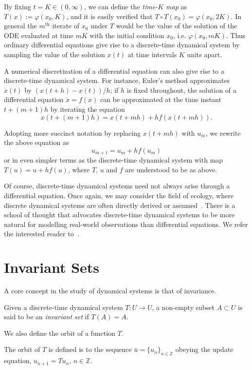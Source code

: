 By fixing $t=K \in (0,\infty)$, we can define the \emph{time-$K$ map} as  $T(x):= \varphi(x_0,K)$, and it is easily verified that $T\circ T(x_0) = \varphi(x_0,2K)$. In general the $m^{\mbox{th}}$ iterate of $x_0$ under $T$ would be the value of the solution of the ODE evaluated at time $mK$ with the initial condition $x_0$, i.e. $\varphi(x_0, mK)$. 
Thus ordinary differential equations give rise to a discrete-time dynamical system by sampling the value of the solution $x(t)$ at time intervals $K$ units apart. 


A numerical discretization of a differential equation can also give rise to a discrete-time dynamical system. For instance, Euler's method approximates $\dot{x}(t)$ by $(x(t+h)-x(t))/h$; if $h$ is fixed throughout, the solution of a differential equation $\dot{x}=f(x)$ 
can be approximated at the time instant $t+(m+1)h$ by iterating the equation 
\begin{equation}
  x(t+(m+1)h) = x(t+mh) + h f(x(t+mh)).
\end{equation}

Adopting more succinct notation by replacing $x(t+mh)$ with $u_m$, we rewrite the above equation as
\begin{equation}
u_{m+1} = u_m + hf(u_m)
\end{equation}
or in even simpler terms as the discrete-time dynamical system with map $T(u) = u + hf(u)$, where $T$, $u$ and $f$ are understood to be as above.


Of course, discrete-time dynamical systems need not always arise through a differential equation. Once again, we may consider the field of ecology, where discrete dynamical systems are often directly derived or assumed~\cite{saber2010introduction}. 
There is a school of thought that advocates discrete-time dynamical systems to be more natural for modelling real-world observations than differential equations. We refer the interested reader to~\cite{saber2010introduction}.


\section{Invariant Sets}

A core concept in the study of dynamical systems is that of invariance. 
\begin{Definition}
  \label{Dfn_InvariantSet}\rm
  Given a discrete-time dynamical system $T: U \to U$, a non-empty subset $A \subset U$ is said to be an \emph{invariant set} if $T(A) =A$. 
\end{Definition}
We also define the orbit of a function $T$.
\begin{Definition}
  [\bf Orbit of $T$]\label{Dfn_Orbit}\rm
  The orbit of $T$ is defined  is to the sequence $\bar{u} = {\{u_n\}}_{n\in \mathbb{Z}}$ obeying the update equation, $u_{n+1}=Tu_n$, $n \in \mathbb{Z}$. 
\end{Definition}

